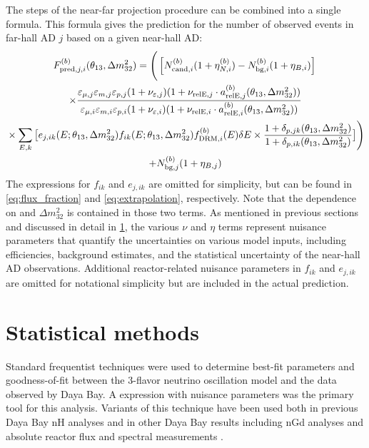 The steps of the near-far projection procedure can be combined into a single formula.
This formula gives the prediction for the number of observed events
in far-hall AD $j$ based on a given near-hall AD:
\begin{multline}\label{eq:full_prediction}
    F_{\text{pred},j,i}^{(b)}(\theta_{13},\Delta m^2_{32}) =
    \Bigg(
    \left[N_{\text{cand},i}^{(b)}(1 + \eta_{N,i}^{(b)}) - N_{\text{bg},i}^{(b)}
    (1 + \eta_{B,i})\right]\bigg. \\
    \times \frac{
        \varepsilon_{\mu,j}\varepsilon_{m,j}\varepsilon_{p,j}
        (1 + \nu_{\varepsilon,j})
        (1 + \nu_{\text{relE},j}\cdot a_{\text{relE},j}^{(b)}(\theta_{13},\Delta m^2_{32}))
    }{
        \varepsilon_{\mu,i}\varepsilon_{m,i}\varepsilon_{p,i}
        (1+\nu_{\varepsilon,i})
        (1 + \nu_{\text{relE},i}\cdot a_{\text{relE},i}^{(b)}(\theta_{13},\Delta m^2_{32}))
    } \\
    \bigg.
    \times \sum_{E,k} \big[
        e_{j,ik}(E; \theta_{13},\Delta m^2_{32}) f_{ik}(E; \theta_{13},\Delta m^2_{32})
        f_{\text{DRM},i}^{(b)}(E) \delta E
    \times \frac{
        1 + \delta_{p,jk}(\theta_{13}, \Delta m^2_{32})
    }{
        1 + \delta_{p,ik}(\theta_{13}, \Delta m^2_{32})
    } \big] \Bigg) \\
    + N_{\text{bg},j}^{(b)}(1 + \eta_{B,j})
\end{multline}
The expressions for $f_{ik}$ and $e_{j,ik}$ are omitted for simplicity,
but can be found in \cref{eq:flux_fraction} and \cref{eq:extrapolation}, respectively.
Note that the dependence on \thetaot{} and $\Delta m^2_{32}${} is contained in those two terms.
As mentioned in previous sections and discussed in detail in \cref{sec:fitter},
the various $\nu$ and $\eta$ terms represent nuisance parameters
that quantify the uncertainties on various model inputs,
including efficiencies, background estimates,
and the statistical uncertainty of the near-hall AD observations.
Additional reactor-related nuisance parameters in $f_{ik}$ and $e_{j,ik}$ are omitted
for notational simplicity but are included in the actual prediction.

\section{Statistical methods}
\label{sec:fitter}

Standard frequentist techniques were used to determine best-fit parameters
and goodness-of-fit between the 3-flavor neutrino oscillation model
and the data observed by Daya Bay.
A \chisquare{} expression with nuisance parameters
was the primary tool for this analysis.
Variants of this technique have been used both in previous Daya Bay nH analyses
and in other Daya Bay results including nGd \thetaot{} analyses
and absolute reactor \nuebar{} flux and spectral measurements
\cite{nh2016,ngd2016,reactorflux2017,extractionreactorflux2019}.

